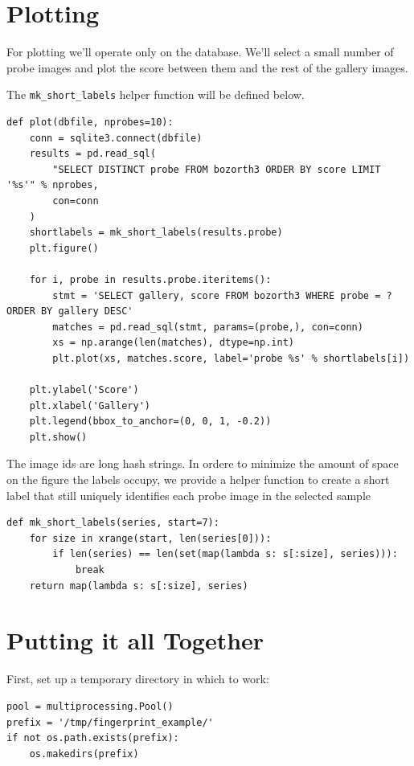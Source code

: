 \section{Plotting}\label{plotting}

For plotting we'll operate only on the database. We'll select a small
number of probe images and plot the score between them and the rest of
the gallery images.

The \texttt{mk\_short\_labels} helper function will be defined below.

\begin{lstlisting}
def plot(dbfile, nprobes=10):
    conn = sqlite3.connect(dbfile)
    results = pd.read_sql(
        "SELECT DISTINCT probe FROM bozorth3 ORDER BY score LIMIT '%s'" % nprobes,
        con=conn
    )
    shortlabels = mk_short_labels(results.probe)
    plt.figure()

    for i, probe in results.probe.iteritems():
        stmt = 'SELECT gallery, score FROM bozorth3 WHERE probe = ? ORDER BY gallery DESC'
        matches = pd.read_sql(stmt, params=(probe,), con=conn)
        xs = np.arange(len(matches), dtype=np.int)
        plt.plot(xs, matches.score, label='probe %s' % shortlabels[i])

    plt.ylabel('Score')
    plt.xlabel('Gallery')
    plt.legend(bbox_to_anchor=(0, 0, 1, -0.2))
    plt.show()
\end{lstlisting}

The image ids are long hash strings. In ordere to minimize the amount of
space on the figure the labels occupy, we provide a helper function to
create a short label that still uniquely identifies each probe image in
the selected sample

\begin{lstlisting}
def mk_short_labels(series, start=7):
    for size in xrange(start, len(series[0])):
        if len(series) == len(set(map(lambda s: s[:size], series))):
            break
    return map(lambda s: s[:size], series)
\end{lstlisting}

\section{Putting it all Together}\label{putting-it-all-together}

First, set up a temporary directory in which to work:

\begin{lstlisting}
pool = multiprocessing.Pool()
prefix = '/tmp/fingerprint_example/'
if not os.path.exists(prefix):
    os.makedirs(prefix)
\end{lstlisting}


